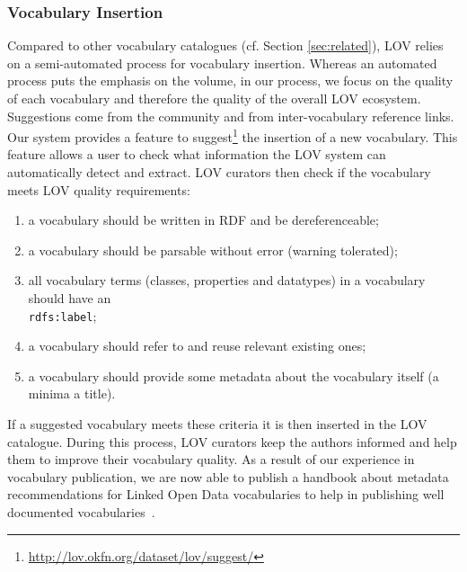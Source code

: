 \documentclass{iosart2c}
\begin{document}
	\subsubsection{Vocabulary Insertion}\label{sssec:vocabInsert} Compared to other vocabulary catalogues (cf. Section \ref{sec:related}), LOV relies on a semi-automated process for vocabulary insertion. Whereas an automated process puts the emphasis on the volume, in our process, we focus on the quality of each vocabulary and therefore the quality of the overall LOV ecosystem. Suggestions come from the community and from inter-vocabulary reference links. Our system provides a feature to suggest\footnote{\url{http://lov.okfn.org/dataset/lov/suggest/}} the insertion of a new vocabulary. This feature allows a user to check what information the LOV system can automatically detect and extract. LOV curators then check if the vocabulary meets LOV quality requirements:
\begin{enumerate}
 \item a vocabulary should be written in RDF and be dereferenceable;
 \item a vocabulary should be parsable without error (warning tolerated);
 \item all vocabulary terms (classes, properties and datatypes) in a vocabulary should have an \\ {\small\texttt{rdfs:label}};
 \item a vocabulary should refer to and reuse relevant existing ones;
 \item a vocabulary should provide some metadata about the vocabulary itself (a minima a title).
\end{enumerate}
If a suggested vocabulary meets these criteria it is then inserted in the LOV catalogue. During this process, LOV curators keep the authors informed and help them to improve their vocabulary quality. As a result of our experience in vocabulary publication, we are now able to publish a handbook about metadata recommendations for Linked Open Data vocabularies to help in publishing well documented vocabularies~\cite{vandenbussche2011metadata}.

\end{document}
